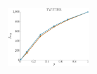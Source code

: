 \documentclass[a4paper]{report}
\newcommand{\wratio}{0.16}
\begin{document}
\vfill
\includegraphics[width=\wratio\textwidth]{influence/TWITTER/fs_twitter}\hfill
\clearpage
\end{document}
